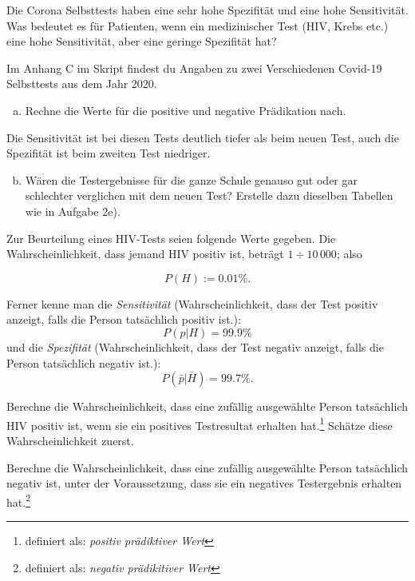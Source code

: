\documentclass[%
11pt,%
twoside,%
titlepage,%
german,%
headsepline%
]{scrartcl}
\begin{document}
\begin{ueb}
Die Corona Selbsttests haben eine sehr hohe Spezifität und eine hohe Sensitivität. Was bedeutet es für Patienten, wenn ein medizinischer Test (HIV, Krebs etc.) eine hohe Sensitivität, aber eine geringe Spezifität hat?
\end{ueb}

\begin{ueb}[Selbsttest 2020]
Im Anhang C im Skript findest du Angaben zu zwei Verschiedenen Covid-19 Selbsttests aus dem Jahr 2020.
\begin{enumerate}[a)]
    \item Rechne die Werte für die positive und negative Prädikation nach.
\end{enumerate}
Die Sensitivität ist bei diesen Tests deutlich tiefer als beim neuen Test, auch die Spezifität ist beim zweiten Test niedriger.
\begin{enumerate}[a)]
\setcounter{enumi}{1}
\item Wären die Testergebnisse für die ganze Schule genauso gut oder gar schlechter verglichen mit dem neuen Test? Erstelle dazu dieselben Tabellen wie in Aufgabe 2e).
\end{enumerate}
\end{ueb}

\begin{ueb}
\label{ueb:hiv}
Zur
Beurteilung eines HIV-Tests seien folgende Werte gegeben. Die Wahrscheinlichkeit, dass jemand HIV positiv ist, beträgt $1\div10\,000$; also

$$P(H):=0.01\%.$$

Ferner kenne man die \emph{Sensitivität} (Wahrscheinlichkeit, dass der Test positiv anzeigt, falls die Person tatsächlich positiv ist.):
$$P(p|H)=99.9\%$$
und die \emph{Spezifität} (Wahrscheinlichkeit, dass der Test negativ anzeigt, falls die Person tatsächlich negativ ist.):
$$P(\bar{p}|\bar{H})=99.7\%.$$

\begin{enumeratea}
\item Berechne die Wahrscheinlichkeit, dass eine zufällig ausgewählte Person tatsächlich HIV positiv ist, wenn sie ein positives Testresultat erhalten hat.\footnote{definiert als: \emph{positiv prädiktiver Wert}} Schätze diese Wahrscheinlichkeit zuerst.
\item Berechne die Wahrscheinlichkeit, dass eine zufällig ausgewählte Person tatsächlich negativ ist, unter der Voraussetzung, dass sie ein negatives Testergebnis erhalten hat.\footnote{definiert als: \emph{negativ prädikitiver Wert}}
\end{enumeratea}

\end{ueb}
\end{document}
